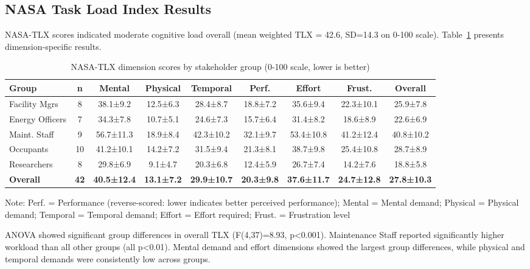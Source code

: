\documentclass[acmlarge]{acmart}
\begin{document}
\subsection{NASA Task Load Index Results}

NASA-TLX scores indicated moderate cognitive load overall (mean weighted TLX = 42.6, SD=14.3 on 0-100 scale). Table~\ref{tab:tlx-results} presents dimension-specific results.

\begin{table}[h]
\centering
\begin{threeparttable}
\caption{NASA-TLX dimension scores by stakeholder group (0-100 scale, lower is better)}
\label{tab:tlx-results}
\scriptsize
\begin{tabular}{@{}lcccccccc@{}}
\toprule
\textbf{Group} & \textbf{n} & \textbf{Mental} & \textbf{Physical} & \textbf{Temporal} & \textbf{Perf.} & \textbf{Effort} & \textbf{Frust.} & \textbf{Overall} \\
\midrule
Facility Mgrs & 8 & 38.1±9.2 & 12.5±6.3 & 28.4±8.7 & 18.8±7.2 & 35.6±9.4 & 22.3±10.1 & 25.9±7.8 \\
Energy Officers & 7 & 34.3±7.8 & 10.7±5.1 & 24.6±7.3 & 15.7±6.4 & 31.4±8.2 & 18.6±8.9 & 22.6±6.9 \\
Maint. Staff & 9 & 56.7±11.3 & 18.9±8.4 & 42.3±10.2 & 32.1±9.7 & 53.4±10.8 & 41.2±12.4 & 40.8±10.2 \\
Occupants & 10 & 41.2±10.1 & 14.2±7.2 & 31.5±9.4 & 21.3±8.1 & 38.7±9.8 & 25.4±10.8 & 28.7±8.9 \\
Researchers & 8 & 29.8±6.9 & 9.1±4.7 & 20.3±6.8 & 12.4±5.9 & 26.7±7.4 & 14.2±7.6 & 18.8±5.8 \\
\midrule
\textbf{Overall} & \textbf{42} & \textbf{40.5±12.4} & \textbf{13.1±7.2} & \textbf{29.9±10.7} & \textbf{20.3±9.8} & \textbf{37.6±11.7} & \textbf{24.7±12.8} & \textbf{27.8±10.3} \\
\bottomrule
\end{tabular}
\begin{tablenotes}
\small
\item Note: Perf. = Performance (reverse-scored: lower indicates better perceived performance); Mental = Mental demand; Physical = Physical demand; Temporal = Temporal demand; Effort = Effort required; Frust. = Frustration level
\end{tablenotes}
\end{threeparttable}
\end{table}

ANOVA showed significant group differences in overall TLX (F(4,37)=8.93, p<0.001). Maintenance Staff reported significantly higher workload than all other groups (all p<0.01). Mental demand and effort dimensions showed the largest group differences, while physical and temporal demands were consistently low across groups.
\end{document}
